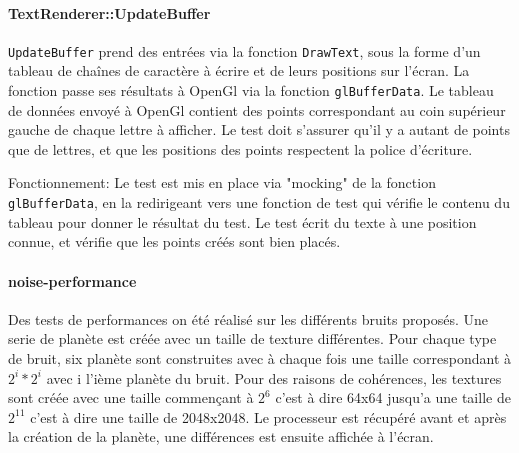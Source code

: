 

\paragraph{TextRenderer::UpdateBuffer}\label{textrendererupdatebuffer}

\texttt{UpdateBuffer} prend des entrées via la fonction
\texttt{DrawText}, sous la forme d'un tableau de chaînes de caractère à
écrire et de leurs positions sur l'écran. La fonction passe ses
résultats à OpenGl via la fonction \texttt{glBufferData}. Le tableau de
données envoyé à OpenGl contient des points correspondant au coin
supérieur gauche de chaque lettre à afficher. Le test doit s'assurer
qu'il y a autant de points que de lettres, et que les positions des
points respectent la police d'écriture.

Fonctionnement: Le test est mis en place via "mocking" de la fonction
\texttt{glBufferData}, en la redirigeant vers une fonction de test qui vérifie le
contenu du tableau pour donner le résultat du test. Le test écrit du
texte à une position connue, et vérifie que les points créés sont bien
placés.



\paragraph{noise-performance}

Des tests de performances on été réalisé sur les différents bruits proposés. Une serie de planète est créée avec un taille de texture différentes. Pour chaque type de bruit, six planète sont construites avec à chaque fois une taille correspondant à $2^{i} * 2^{i}$ avec i l'ième planète du bruit. Pour des raisons de cohérences, les textures sont créée avec une taille commençant à $2^{6}$ c'est à dire 64x64 jusqu'a une taille de $2^{11}$ c'est à dire une taille de 2048x2048. Le processeur est récupéré avant et après la création de la planète, une différences est ensuite affichée à l'écran.\\

